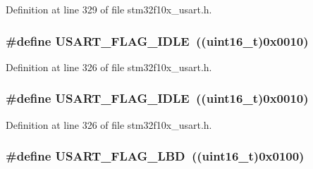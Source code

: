 Definition at line 329 of file stm32f10x\+\_\+usart.\+h.

\subsubsection[{\texorpdfstring{U\+S\+A\+R\+T\+\_\+\+F\+L\+A\+G\+\_\+\+I\+D\+LE}{USART_FLAG_IDLE}}]{\setlength{\rightskip}{0pt plus 5cm}\#define U\+S\+A\+R\+T\+\_\+\+F\+L\+A\+G\+\_\+\+I\+D\+LE~(({\bf uint16\+\_\+t})0x0010)}\hypertarget{group___u_s_a_r_t___flags_gac2f1ccc91a834f9cbec3f058872b972a}{}\label{group___u_s_a_r_t___flags_gac2f1ccc91a834f9cbec3f058872b972a}


Definition at line 326 of file stm32f10x\+\_\+usart.\+h.

\subsubsection[{\texorpdfstring{U\+S\+A\+R\+T\+\_\+\+F\+L\+A\+G\+\_\+\+I\+D\+LE}{USART_FLAG_IDLE}}]{\setlength{\rightskip}{0pt plus 5cm}\#define U\+S\+A\+R\+T\+\_\+\+F\+L\+A\+G\+\_\+\+I\+D\+LE~(({\bf uint16\+\_\+t})0x0010)}\hypertarget{group___u_s_a_r_t___flags_gac2f1ccc91a834f9cbec3f058872b972a}{}\label{group___u_s_a_r_t___flags_gac2f1ccc91a834f9cbec3f058872b972a}


Definition at line 326 of file stm32f10x\+\_\+usart.\+h.

\subsubsection[{\texorpdfstring{U\+S\+A\+R\+T\+\_\+\+F\+L\+A\+G\+\_\+\+L\+BD}{USART_FLAG_LBD}}]{\setlength{\rightskip}{0pt plus 5cm}\#define U\+S\+A\+R\+T\+\_\+\+F\+L\+A\+G\+\_\+\+L\+BD~(({\bf uint16\+\_\+t})0x0100)}\hypertarget{group___u_s_a_r_t___flags_ga27be6517de20ce14711f71dcd5a7b91f}{}\label{group___u_s_a_r_t___flags_ga27be6517de20ce14711f71dcd5a7b91f}


